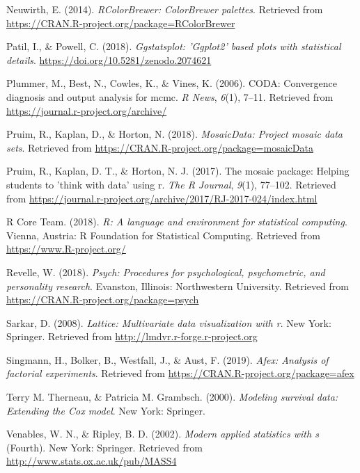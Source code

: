 \documentclass[man]{apa6}
\begin{document}
\leavevmode\hypertarget{ref-R-RColorBrewer}{}%
Neuwirth, E. (2014). \emph{RColorBrewer: ColorBrewer palettes}. Retrieved from \url{https://CRAN.R-project.org/package=RColorBrewer}

\leavevmode\hypertarget{ref-R-ggstatsplot}{}%
Patil, I., \& Powell, C. (2018). \emph{Ggstatsplot: 'Ggplot2' based plots with statistical details}. \url{https://doi.org/10.5281/zenodo.2074621}

\leavevmode\hypertarget{ref-R-coda}{}%
Plummer, M., Best, N., Cowles, K., \& Vines, K. (2006). CODA: Convergence diagnosis and output analysis for mcmc. \emph{R News}, \emph{6}(1), 7--11. Retrieved from \url{https://journal.r-project.org/archive/}

\leavevmode\hypertarget{ref-R-mosaicData}{}%
Pruim, R., Kaplan, D., \& Horton, N. (2018). \emph{MosaicData: Project mosaic data sets}. Retrieved from \url{https://CRAN.R-project.org/package=mosaicData}

\leavevmode\hypertarget{ref-R-mosaic}{}%
Pruim, R., Kaplan, D. T., \& Horton, N. J. (2017). The mosaic package: Helping students to 'think with data' using r. \emph{The R Journal}, \emph{9}(1), 77--102. Retrieved from \url{https://journal.r-project.org/archive/2017/RJ-2017-024/index.html}

\leavevmode\hypertarget{ref-R-base}{}%
R Core Team. (2018). \emph{R: A language and environment for statistical computing}. Vienna, Austria: R Foundation for Statistical Computing. Retrieved from \url{https://www.R-project.org/}

\leavevmode\hypertarget{ref-R-psych}{}%
Revelle, W. (2018). \emph{Psych: Procedures for psychological, psychometric, and personality research}. Evanston, Illinois: Northwestern University. Retrieved from \url{https://CRAN.R-project.org/package=psych}

\leavevmode\hypertarget{ref-R-lattice}{}%
Sarkar, D. (2008). \emph{Lattice: Multivariate data visualization with r}. New York: Springer. Retrieved from \url{http://lmdvr.r-forge.r-project.org}

\leavevmode\hypertarget{ref-R-afex}{}%
Singmann, H., Bolker, B., Westfall, J., \& Aust, F. (2019). \emph{Afex: Analysis of factorial experiments}. Retrieved from \url{https://CRAN.R-project.org/package=afex}

\leavevmode\hypertarget{ref-R-survival-book}{}%
Terry M. Therneau, \& Patricia M. Grambsch. (2000). \emph{Modeling survival data: Extending the Cox model}. New York: Springer.

\leavevmode\hypertarget{ref-R-MASS}{}%
Venables, W. N., \& Ripley, B. D. (2002). \emph{Modern applied statistics with s} (Fourth). New York: Springer. Retrieved from \url{http://www.stats.ox.ac.uk/pub/MASS4}
\end{document}
